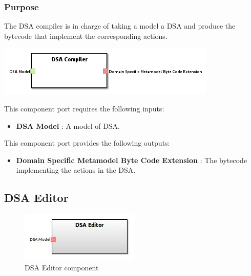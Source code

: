 \documentclass{gemoc} %
\begin{document}
\subsubsection{Purpose}
The DSA compiler is in charge of taking a model a DSA and produce the bytecode that implement the corresponding actions.

\begin{center}
\includegraphics*[trim=0.0cm 0.0cm 0cm 0.0cm, clip=true]{../images/generated/Generated_DSA_Compiler.png}
\end{center}

This component port requires the following inputs:
\begin{itemize}
  \item \textbf{DSA Model} :
A model of DSA.
\end{itemize}

This component port provides the following outputs:
\begin{itemize}
  \item \textbf{Domain Specific Metamodel Byte Code Extension} :
The bytecode implementing the actions in the DSA.
\end{itemize}

\subsection{DSA Editor}

\begin{figure}[htp]
	\begin{center}
	\includegraphics*[trim=0.0cm 0.0cm 0cm 0.0cm, clip=true, scale=1.0]{../images/generated/Generated_DSA Editor.jpg}
	\caption{DSA Editor component}
	\end{center}
\end{figure}
\end{document}
